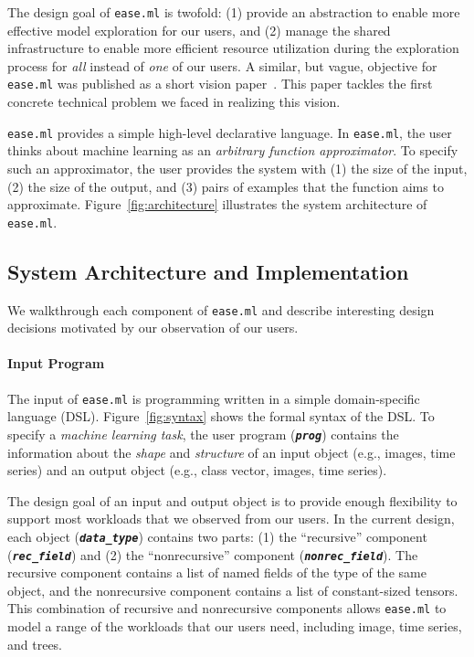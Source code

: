 \documentclass[letterpaper]{vldb}
\newcommand{\eml}{\texttt{ease.ml}\xspace}
\begin{document}
The design goal of \eml is twofold: (1) provide an abstraction
to enable more effective model exploration for our users, and 
(2) manage the shared infrastructure to enable more efficient
resource utilization during the exploration process 
for {\em all} instead of {\em one} of our users.
A similar, but vague, objective for \eml was published as a short vision paper~\cite{HILDA}. This paper tackles the first
concrete technical problem we faced in realizing this
vision.

\eml provides a simple high-level declarative language.
In \eml, the user thinks about machine learning as an {\em arbitrary function approximator}.
To specify such an approximator, the user provides the
system with (1) the size of the input, (2) the size of the output,
and (3) pairs of examples that the function aims to approximate.
Figure~\ref{fig:architecture} illustrates the system architecture of \eml.

\vspace{-0.5em}
\subsection{System Architecture and Implementation}

We walkthrough each component of \eml and 
describe interesting design decisions
motivated by our observation of our users. 

\vspace{-1em}
\paragraph*{Input Program} The input
of \eml is programming written in 
a simple domain-specific language (DSL). Figure~\ref{fig:syntax}
shows the formal syntax of the DSL. To specify
a {\em machine learning task}, the user program (\textbf{\texttt{\em prog}})
contains the information about the {\em shape}
and {\em structure} of an input object (e.g., images, time series)
and an output object (e.g., class vector, images, time series).

The design goal of an input and output
object is to provide enough flexibility to support most
workloads that we observed from our users. In the current design,
each object (\textbf{\texttt{\em data\_type}}) contains two parts:
(1) the ``recursive'' component (\textbf{\texttt{\em rec\_field}})
and (2) the ``nonrecursive'' component (\textbf{\texttt{\em nonrec\_field}}).
The recursive component contains a list of named 
fields of the type of the same object, and the nonrecursive
component contains a list of constant-sized tensors.
This combination of recursive and nonrecursive
components allows \eml to model a range of the workloads that our users need, including image, time series, and trees.
\end{document}
